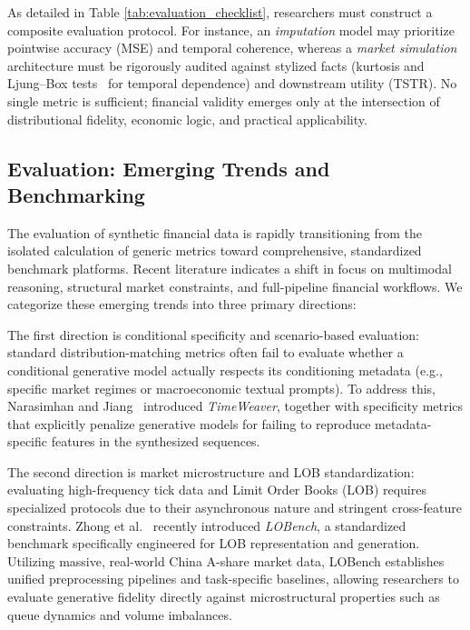 As detailed in Table \ref{tab:evaluation_checklist}, researchers must construct a composite evaluation protocol. For instance, an \textit{imputation} model may prioritize pointwise accuracy (MSE) and temporal coherence, whereas a \textit{market simulation} architecture must be rigorously audited against stylized facts (kurtosis and Ljung--Box tests~\citep{ljung1978measure} for temporal dependence) and downstream utility (TSTR). No single metric is sufficient; financial validity emerges only at the intersection of distributional fidelity, economic logic, and practical applicability.

\subsection{Evaluation: Emerging Trends and Benchmarking}

The evaluation of synthetic financial data is rapidly transitioning from the isolated calculation of generic metrics toward comprehensive, standardized benchmark platforms. Recent literature indicates a shift in focus on multimodal reasoning, structural market constraints, and full-pipeline financial workflows. We categorize these emerging trends into three primary directions:

The first direction is conditional specificity and scenario-based evaluation: standard distribution-matching metrics often fail to evaluate whether a conditional generative model actually respects its conditioning metadata (e.g., specific market regimes or macroeconomic textual prompts). To address this, Narasimhan and Jiang~\citep{narasimhan2024timeweaver} introduced \textit{TimeWeaver}, together with specificity metrics that explicitly penalize generative models for failing to reproduce metadata-specific features in the synthesized sequences.

The second direction is market microstructure and LOB standardization: evaluating high-frequency tick data and Limit Order Books (LOB) requires specialized protocols due to their asynchronous nature and stringent cross-feature constraints. Zhong et al.~\citep{lobench2025} recently introduced \textit{LOBench}, a standardized benchmark specifically engineered for LOB representation and generation. Utilizing massive, real-world China A-share market data, LOBench establishes unified preprocessing pipelines and task-specific baselines, allowing researchers to evaluate generative fidelity directly against microstructural properties such as queue dynamics and volume imbalances.

